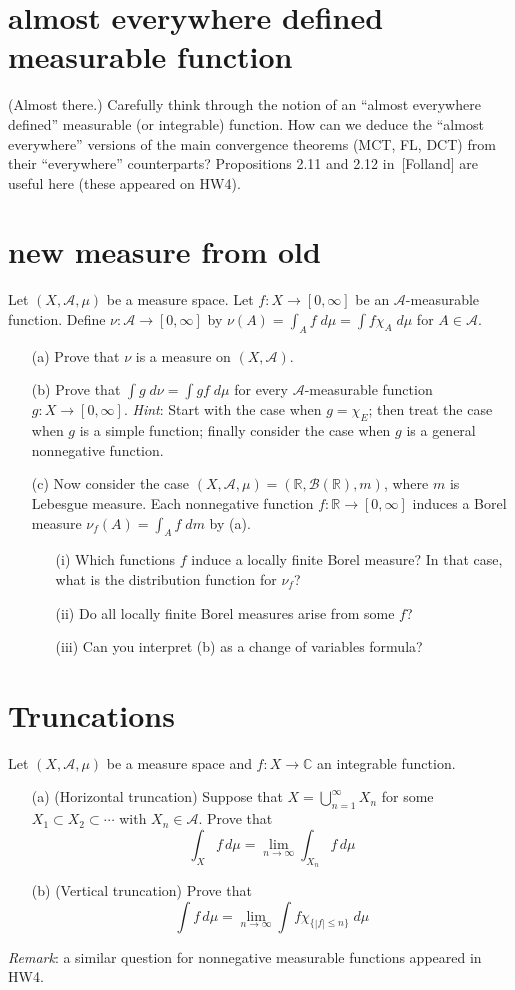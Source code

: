 \documentclass[lang=cn,11pt]{elegantbook}
\begin{document}
\section{almost everywhere defined measurable function}
(Almost there.)
  Carefully think through the notion of an ``almost everywhere defined'' measurable (or integrable) function.
  How can we deduce the ``almost everywhere'' versions of the main convergence theorems (MCT, FL, DCT) from their ``everywhere'' counterparts?
  Propositions 2.11 and 2.12 in~[Folland] are useful here (these appeared on HW4).
  
\section{new measure from old}
  Let $(X, \mathcal{A},\mu)$ be a measure space. Let $f\colon X\to[0,\infty]$ be an $ \mathcal{A}$-measurable function.
Define $\nu\colon  \mathcal{A}\to[0,\infty]$ by  $\nu(A)=\int_A f\; d\mu= \int f\chi_A\; d\mu$ for $A\in \mathcal{A}$.  
\begin{itemize}
\item[(a)]Prove that $\nu$ is a measure on $(X, \mathcal{A})$. 
\item[(b)]Prove that $\int g \; d \nu= \int gf \; d\mu$ for every $ \mathcal{A}$-measurable function $g\colon X\to [0, \infty]$. 
\textit{Hint}: Start with the case when $g=\chi_E$; then treat the case when $g$ is a simple function; finally consider the case when $g$ is a general nonnegative function.
\item[(c)]Now  consider the case $(X, \mathcal{A},\mu)=(\mathbb{R},\mathcal{B}(\mathbb{R}), m)$, where $m$ is Lebesgue measure. 
Each nonnegative function $f\colon \mathbb{R} \to[0,\infty]$ induces a Borel measure $\nu_f(A)= \int_A f \; d m$ by (a).
\begin{itemize}
\item[(i)]Which functions $f$ induce a locally finite Borel measure? In that case, what is the distribution function for $\nu_f$?
\item[(ii)] Do all locally finite Borel measures arise from some $f$?
\item[(iii)] Can you interpret (b) as a change of variables formula? 
\end{itemize}
\end{itemize}

\section{Truncations}
Let $(X,\mathcal{A},\mu)$ be a measure space and $f\colon X\to\mathbb{C}$ an integrable function.
\begin{itemize}
\item[(a)] (Horizontal truncation) Suppose that $X=\bigcup_{n=1}^\infty X_n$ for some $X_1\subset X_2\subset \cdots$ 
with $X_n\in \mathcal{A}$. Prove that 
\[
  \int_X f \,d\mu = \lim_{n\to \infty} \int_{X_n} f\,d\mu
\]
\item[(b)] (Vertical truncation) Prove that
\[
  \int f\,d\mu = \lim_{n\to \infty} \int f\chi_{\{|f|\le n\}}\; d\mu
\]
\end{itemize}
\textit{Remark}: a similar question for nonnegative measurable functions appeared in HW4.
\end{document}
